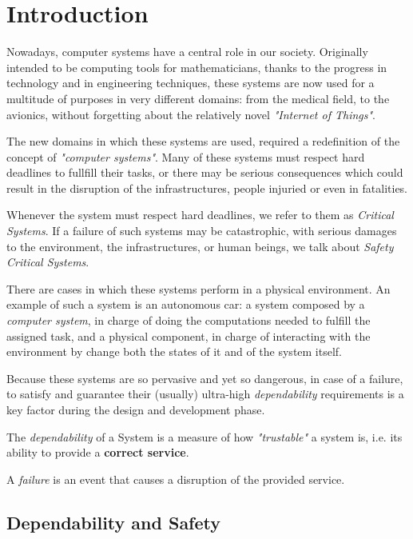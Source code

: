 \chapter{Introduction}

Nowadays, computer systems have a central role in our society. Originally intended to be computing tools for mathematicians, thanks to the progress in technology and in engineering techniques, these systems are now used for a multitude of purposes in very different domains: from the medical field, to the avionics, without forgetting about the relatively novel \textsl{"Internet of Things"}.

The new domains in which these systems are used, required a redefinition of the concept of \textsl{"computer systems"}. Many of these systems must respect hard deadlines to fullfill their tasks, or there may be serious consequences which could result in the disruption of the infrastructures, people injuried or even in fatalities.

Whenever the system must respect hard deadlines, we refer to them as \textsl{Critical Systems}. If a failure of such systems may be catastrophic, with serious damages to the environment, the infrastructures, or human beings, we talk about \textsl{Safety Critical Systems}.\cite{safety-critical}

There are cases in which these systems perform in a physical environment. An example of such a system is an autonomous car: a system composed by a \textsl{computer system}, in charge of doing the computations needed to fulfill the assigned task, and a physical component, in charge of interacting with the environment by change both the states of it and of the system itself.

Because these systems are so pervasive and yet so dangerous, in case of a failure, to satisfy and guarantee their (usually) ultra-high \textsl{dependability} requirements is a key factor during the design and development phase.

The \textsl{dependability} of a System is a measure of how \textsl{"trustable"} a system is, i.e. its ability to provide a \textbf{correct service}.\cite{dependabilitypaper}

A \textsl{failure} is an event that causes a disruption of the provided service.

\section{Dependability and Safety}

